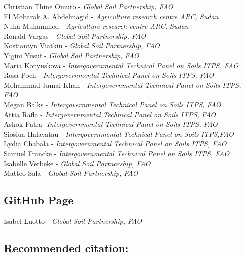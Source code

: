 \documentclass[
  10pt,
  b5paper,
]{book}
\begin{document}
Christian Thine Omuto - \emph{Global Soil Partnership, FAO }\\
El Mobarak A. Abdelmagid - \emph{Agriculture research centre ARC, Sudan}\\
Nuha Muhammed - \emph{Agriculture research centre ARC, Sudan}\\
Ronald Vargas - \emph{Global Soil Partnership, FAO }\\
Kostiantyn Viatkin - \emph{Global Soil Partnership, FAO }\\
Yigini Yusuf - \emph{Global Soil Partnership, FAO }\\
Maria Konyuskova - \emph{Intergovernmental Technical Panel on Soils ITPS, FAO}\\
Rosa Poch - \emph{Intergovernmental Technical Panel on Soils ITPS, FAO}\\
Mohammad Jamal Khan - \emph{Intergovernmental Technical Panel on Soils ITPS, FAO}\\
Megan Balks - \emph{Intergovernmental Technical Panel on Soils ITPS, FAO}\\
Attia Rafla - \emph{Intergovernmental Technical Panel on Soils ITPS, FAO}\\
Ashok Patra -\emph{Intergovernmental Technical Panel on Soils ITPS, FAO}\\
Siosiua Halavatau - \emph{Intergovernmental Technical Panel on Soils ITPS,FAO}\\
Lydia Chabala - \emph{Intergovernmental Technical Panel on Soils ITPS, FAO}\\
Samuel Francke - \emph{Intergovernmental Technical Panel on Soils ITPS, FAO}\\
Isabelle Verbeke - \emph{Global Soil Partnership, FAO }\\
Matteo Sala - \emph{Global Soil Partnership, FAO }

\hypertarget{github-page}{%
\subsection*{GitHub Page}\label{github-page}}

Isabel Luotto - \emph{Global Soil Partnership, FAO }

\hypertarget{recommended-citation}{%
\subsection*{Recommended citation:}\label{recommended-citation}}
\end{document}
